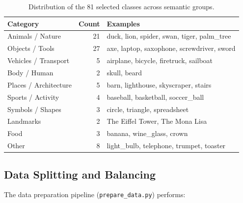 \documentclass[12pt, a4paper]{article}
\begin{document}
\begin{table}[H]
\centering
\caption{Distribution of the 81 selected classes across semantic groups.}
\label{tab:classes}
\begin{tabular}{lrl}
\toprule
\textbf{Category} & \textbf{Count} & \textbf{Examples} \\
\midrule
Animals / Nature       & 21 & duck, lion, spider, swan, tiger, palm\_tree \\
Objects / Tools        & 27 & axe, laptop, saxophone, screwdriver, sword \\
Vehicles / Transport   &  5 & airplane, bicycle, firetruck, sailboat \\
Body / Human           &  2 & skull, beard \\
Places / Architecture  &  5 & barn, lighthouse, skyscraper, stairs \\
Sports / Activity      &  4 & baseball, basketball, soccer\_ball \\
Symbols / Shapes       &  3 & circle, triangle, spreadsheet \\
Landmarks              &  2 & The Eiffel Tower, The Mona Lisa \\
Food                   &  3 & banana, wine\_glass, crown \\
Other                  &  8 & light\_bulb, telephone, trumpet, toaster \\
\bottomrule
\end{tabular}
\end{table}

\subsection{Data Splitting and Balancing}

The data preparation pipeline (\texttt{prepare\_data.py}) performs:
\end{document}

